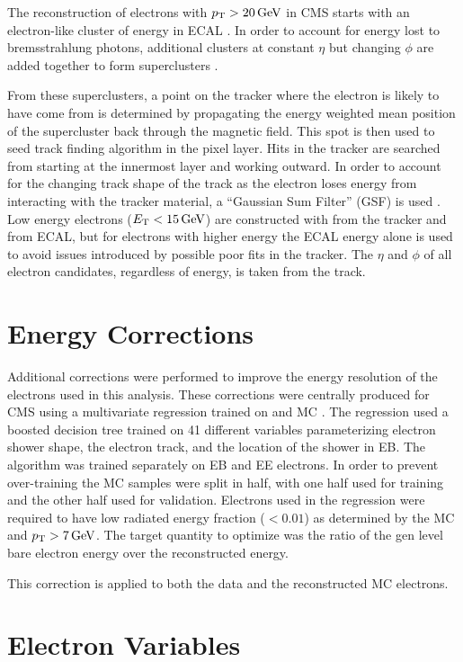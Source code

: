 The reconstruction of electrons with $p_{\mathrm{T}} > 20 \,\text{Ge\hspace{-.08em}V}$ in CMS starts with an
electron-like cluster of energy in ECAL \cite{eg_reco_2010}. In order to
account for energy lost to bremsstrahlung photons, additional clusters at
constant $\eta$ but changing $\phi$ are added together to form superclusters
\cite{baffioni_2007}.

From these superclusters, a point on the tracker where the electron is likely
to have come from is determined by propagating the energy weighted mean
position of the supercluster back through the magnetic field. This spot is then
used to seed  track finding algorithm in the pixel layer. Hits in the tracker
are searched from starting at the innermost layer and working outward. In order
to account for the changing track shape of the track as the electron loses
energy from interacting with the tracker material, a ``Gaussian Sum Filter''
(GSF) is used \cite{adam_2005}. Low energy electrons ($E_{\mathrm{T}} < 15 \,\text{Ge\hspace{-.08em}V}$) are
constructed with \pt from the tracker and \ET from ECAL, but for electrons with
higher energy the ECAL energy alone is used to avoid issues introduced by
possible poor fits in the tracker. The $\eta$ and $\phi$ of all electron
candidates, regardless of energy, is taken from the track.

\section{Energy Corrections}

Additional corrections were performed to improve the energy resolution of the
electrons used in this analysis. These corrections were centrally produced for
CMS using a multivariate regression trained on \Ztoee and \higgstoZZ MC
\cite{cms_an_2012-327}. The regression used a boosted decision tree trained on
41 different variables parameterizing electron shower shape, the electron
track, and the location of the shower in EB. The algorithm was trained
separately on EB and EE electrons. In order to prevent over-training the MC
samples were split in half, with one half used for training and the other half
used for validation. Electrons used in the regression were required to have low
radiated energy fraction ($< 0.01$) as determined by the MC and $p_{\mathrm{T}} > 7 \,\text{Ge\hspace{-.08em}V}$.
The target quantity to optimize was the ratio of the gen level bare electron
energy over the reconstructed energy.

This correction is applied to both the data and the reconstructed MC electrons.

\section{Electron Variables}
\label{sec:electron_variables}

